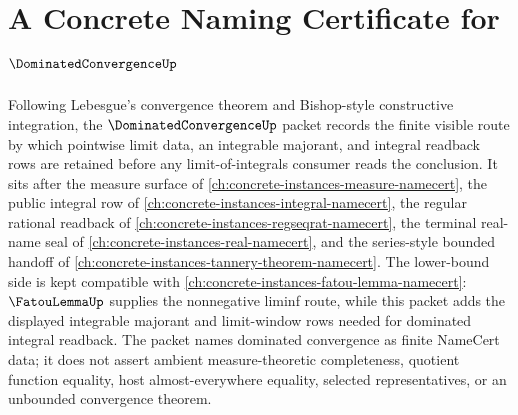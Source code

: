 \chapter{A Concrete Naming Certificate for $\DominatedConvergenceUp$}
\label{ch:concrete-instances-dominated-convergence-namecert}

Following Lebesgue's convergence theorem and Bishop-style constructive integration, the $\DominatedConvergenceUp$ packet records the finite visible route by which pointwise limit data, an integrable majorant, and integral readback rows are retained before any limit-of-integrals consumer reads the conclusion. It sits after the measure surface of \autoref{ch:concrete-instances-measure-namecert}, the public integral row of \autoref{ch:concrete-instances-integral-namecert}, the regular rational readback of \autoref{ch:concrete-instances-regseqrat-namecert}, the terminal real-name seal of \autoref{ch:concrete-instances-real-namecert}, and the series-style bounded handoff of \autoref{ch:concrete-instances-tannery-theorem-namecert}. The lower-bound side is kept compatible with \autoref{ch:concrete-instances-fatou-lemma-namecert}: $\FatouLemmaUp$ supplies the nonnegative liminf route, while this packet adds the displayed integrable majorant and limit-window rows needed for dominated integral readback. The packet names dominated convergence as finite NameCert data; it does not assert ambient measure-theoretic completeness, quotient function equality, host almost-everywhere equality, selected representatives, or an unbounded convergence theorem.

